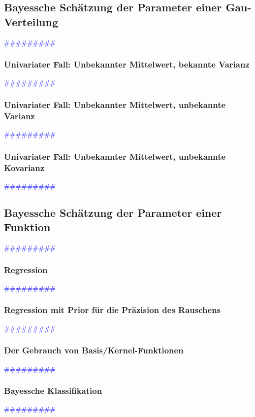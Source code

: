 \documentclass{article}
\begin{document}
  \subsection{Bayessche Schätzung der Parameter einer Gau-Verteilung} %
      \textcolor{blue}{\#\#\#\#\#\#\#\#\#}
    \subsubsection{Univariater Fall: Unbekannter Mittelwert, bekannte Varianz} %
      \textcolor{blue}{\#\#\#\#\#\#\#\#\#}
    \subsubsection{Univariater Fall: Unbekannter Mittelwert, unbekannte Varianz} %
      \textcolor{blue}{\#\#\#\#\#\#\#\#\#}
    \subsubsection{Univariater Fall: Unbekannter Mittelwert, unbekannte Kovarianz} %
      \textcolor{blue}{\#\#\#\#\#\#\#\#\#}
  \subsection{Bayessche Schätzung der Parameter einer Funktion} %
      \textcolor{blue}{\#\#\#\#\#\#\#\#\#}
    \subsubsection{Regression} %
      \textcolor{blue}{\#\#\#\#\#\#\#\#\#}
    \subsubsection{Regression mit Prior für die Präzision des Rauschens} %
      \textcolor{blue}{\#\#\#\#\#\#\#\#\#}
    \subsubsection{Der Gebrauch von Basis/Kernel-Funktionen} %
      \textcolor{blue}{\#\#\#\#\#\#\#\#\#}
    \subsubsection{Bayessche Klassifikation} %
      \textcolor{blue}{\#\#\#\#\#\#\#\#\#}
\end{document}
